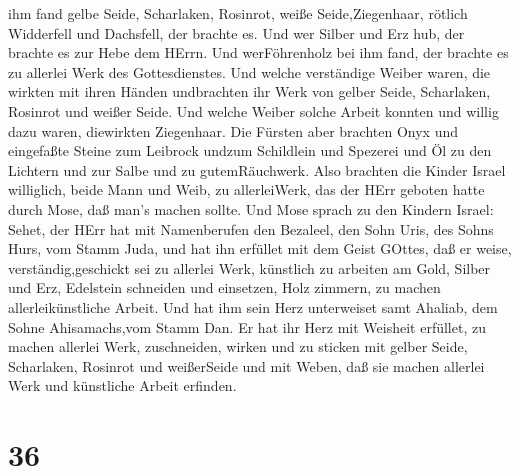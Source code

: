 ihm fand gelbe Seide, Scharlaken, Rosinrot, weiße Seide,Ziegenhaar,
rötlich Widderfell und Dachsfell, der brachte es.  Und wer
Silber und Erz hub, der brachte es zur Hebe dem HErrn. Und werFöhrenholz
bei ihm fand, der brachte es zu allerlei Werk des Gottesdienstes.
 Und welche verständige Weiber waren, die wirkten mit ihren
Händen undbrachten ihr Werk von gelber Seide, Scharlaken, Rosinrot und
weißer Seide.  Und welche Weiber solche Arbeit konnten und
willig dazu waren, diewirkten Ziegenhaar.  Die Fürsten aber
brachten Onyx und eingefaßte Steine zum Leibrock undzum Schildlein
 und Spezerei und Öl zu den Lichtern und zur Salbe und zu
gutemRäuchwerk.  Also brachten die Kinder Israel
williglich, beide Mann und Weib, zu allerleiWerk, das der HErr geboten
hatte durch Mose, daß man's machen sollte.  Und Mose sprach
zu den Kindern Israel: Sehet, der HErr hat mit Namenberufen den
Bezaleel, den Sohn Uris, des Sohns Hurs, vom Stamm Juda, 
und hat ihn erfüllet mit dem Geist GOttes, daß er weise,
verständig,geschickt sei zu allerlei Werk,  künstlich zu
arbeiten am Gold, Silber und Erz,  Edelstein schneiden und
einsetzen, Holz zimmern, zu machen allerleikünstliche Arbeit.
 Und hat ihm sein Herz unterweiset samt Ahaliab, dem Sohne
Ahisamachs,vom Stamm Dan.  Er hat ihr Herz mit Weisheit
erfüllet, zu machen allerlei Werk, zuschneiden, wirken und zu sticken
mit gelber Seide, Scharlaken, Rosinrot und weißerSeide und mit Weben,
daß sie machen allerlei Werk und künstliche Arbeit erfinden.

\hypertarget{section-35}{%
\section{36}\label{section-35}}

